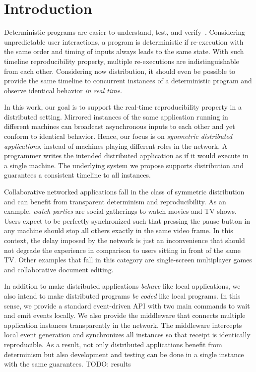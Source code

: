 \documentclass[sigplan,screen]{acmart}
\begin{document}
\section{Introduction}

Deterministic programs are easier to understand, test, and verify~\cite{det}.
Considering unpredictable user interactions, a program is deterministic if
re-execution with the same order and timing of inputs always leads to the same
state.
With such timeline reproducibility property, multiple re-executions are
indistinguishable from each other.
Considering now distribution, it should even be possible to provide the same
timeline to concurrent instances of a deterministic program and observe
identical behavior \emph{in real time}.

In this work, our goal is to support the real-time reproducibility property in
a distributed setting.
Mirrored instances of the same application running in different machines can
broadcast asynchronous inputs to each other and yet conform to
identical behavior.
Hence, our focus is on \emph{symmetric distributed applications}, instead of
machines playing different roles in the network.
A programmer writes the intended distributed application as if it would execute
in a single machine.
The underlying system we propose supports distribution and guarantees a
consistent timeline to all instances.

Collaborative networked applications fall in the class of symmetric
distribution and can benefit from transparent determinism and reproducibility.
As an example, \emph{watch parties} are social gatherings to watch movies and
TV shows.
Users expect to be perfectly synchronized such that pressing the pause button
in any machine should stop all others exactly in the same video frame.
In this context, the delay imposed by the network is just an inconvenience that
should not degrade the experience in comparison to users sitting in front of
the same TV.
Other examples that fall in this category are single-screen multiplayer games
and collaborative document editing.

In addition to make distributed applications \emph{behave} like local
applications, we also intend to make distributed programs \emph{be coded} like
local programs.
In this sense, we provide a standard event-driven API with two main commands
to wait and emit events locally.
We also provide the middleware that connects multiple application instances
transparently in the network.
The middleware intercepts local event generation and synchronizes all instances
so that receipt is identically reproducible.
As a result, not only distributed applications benefit from determinism but
also development and testing can be done in a single instance with the same
guarantees.
TODO: results
\end{document}
